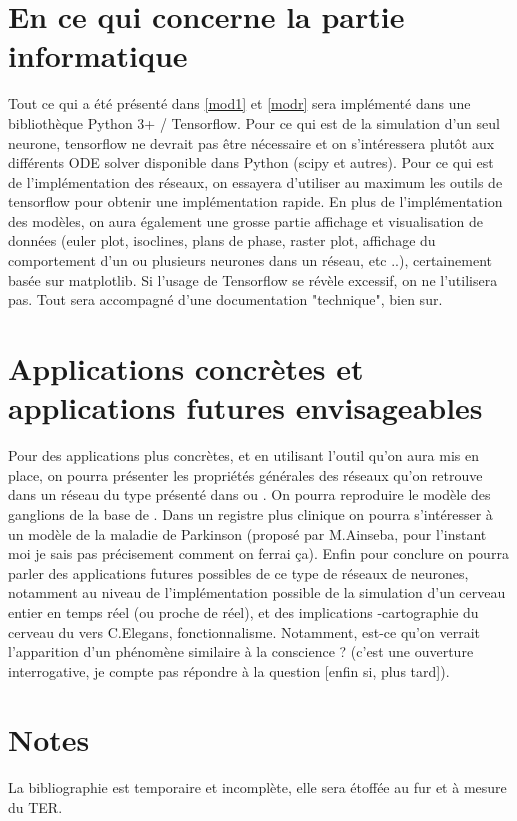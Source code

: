 \documentclass[12pt]{scrartcl}
\begin{document}
\section{En ce qui concerne la partie informatique}

Tout ce qui a été présenté dans \ref{mod1} et \ref{modr} sera implémenté dans une bibliothèque Python 3+ / Tensorflow. Pour ce qui est de la simulation d'un seul neurone, tensorflow ne devrait pas être nécessaire et on s'intéressera plutôt aux différents ODE solver disponible dans Python (scipy et autres). Pour ce qui est de l'implémentation des réseaux, on essayera d'utiliser au maximum les outils de tensorflow pour obtenir une implémentation rapide. En plus de l'implémentation des modèles, on aura également une grosse partie affichage et visualisation de données (euler plot, isoclines, plans de phase, raster plot, affichage du comportement d'un ou plusieurs neurones dans un réseau, etc ..), certainement basée sur matplotlib. Si l'usage de Tensorflow se révèle excessif, on ne l'utilisera pas. Tout sera accompagné d'une documentation "technique", bien sur.


\section{Applications concrètes et applications futures envisageables}

Pour des applications plus concrètes, et en utilisant l'outil qu'on aura mis en place, on pourra présenter les propriétés générales des réseaux qu'on retrouve dans un réseau du type présenté dans \cite{izhi2003} ou \cite{brette2007}. On pourra reproduire le modèle des ganglions de la base de \cite{garenne2016}. Dans un registre plus clinique on pourra s'intéresser à un modèle de la maladie de Parkinson (proposé par M.Ainseba, pour l'instant moi je sais pas précisement comment on ferrai ça). Enfin pour conclure on pourra parler des applications futures possibles de ce type de réseaux de neurones, notamment au niveau de l'implémentation possible de la simulation d'un cerveau entier en temps réel (ou proche de réel), et des implications -cartographie du cerveau du vers C.Elegans, fonctionnalisme. Notamment, est-ce qu'on verrait l'apparition d'un phénomène similaire à la conscience ? (c'est une ouverture interrogative, je compte pas répondre à la question [enfin si, plus tard]).


\section{Notes}

La bibliographie est temporaire et incomplète, elle sera étoffée au fur et à mesure du TER.
\nocite{*}

\pagebreak


\end{document}
